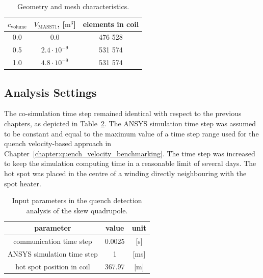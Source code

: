 \begin{table}[H]
    \caption{Geometry and mesh characteristics.} 
    \vspace{-1.em} 
    \fontsize{10}{10}
    \selectfont 
    \renewcommand{\arraystretch}{1.5}
    \begin{center}
        \begin{tabular}{ c | c | c }  
        \hline
        $c_\text{volume}$ & $V_\text{MASS71}$, [$\text{m}^3$] & elements in coil \\
        \hline
        0.0 & 0.0 & 476 528 \\
        0.5 & $2.4 \cdot 10^{-9}$ & 531 574 \\
        1.0 & $4.8 \cdot 10^{-9}$ & 531 574 \\
        \hline 
        \end{tabular}
    \end{center}  
     \label{table: skew_quad_geometry_mesh} 
 \end{table}

\subsection{Analysis Settings}

The co-simulation time step remained identical with respect to the previous chapters, as depicted in Table~\ref{table: skew_quad_quench_detect_input_params}. The ANSYS simulation time step was assumed to be constant and equal to the maximum value of a time step range used for the quench velocity-based approach in Chapter~\ref{chapter:quench_velocity_benchmarking}. The time step was increased to keep the simulation computing time in a reasonable limit of several days. The hot spot was placed in the centre of a winding directly neighbouring with the spot heater.

\begin{table}[H]
    \caption{Input parameters in the quench detection analysis of the skew quadrupole.} 
    \vspace{-1.em} 
    \fontsize{10}{10}
    \selectfont 
    \renewcommand{\arraystretch}{1.5}
    \begin{center}
        \begin{tabular}{ ccc }  
        \hline
        parameter & value & unit \\
        \hline
        communication time step & 0.0025 & [s] \\
        ANSYS simulation time step & 1 & [ms] \\ 
        hot spot position in coil & 367.97 & [m] \\
        \hline 
        \end{tabular}
    \end{center}  
     \label{table: skew_quad_quench_detect_input_params} 
 \end{table}

